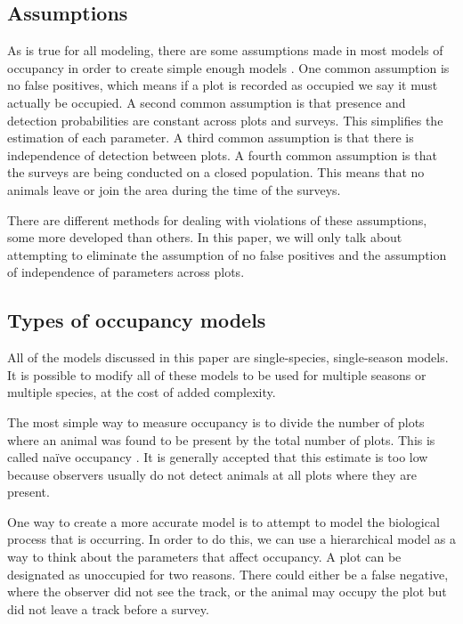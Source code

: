 \documentclass[12pt]{article}
\begin{document}
    \subsection{Assumptions}
    As is true for all modeling, there are some assumptions made in most models
    of occupancy
    in order to create simple enough models \cite{MacKenzie2006}. One common
    assumption is no false positives, which means if a
    plot is recorded as occupied we say it must actually be occupied. A second
    common assumption is that presence and detection probabilities are constant
    across plots and surveys. This simplifies the estimation of each parameter.
    A third common assumption is that there is independence of detection between
    plots. A fourth common assumption is that the surveys are being conducted on
    a closed population. This means that no animals leave or join the
    area during the time of the surveys.

    There are different methods for dealing with violations of these
    assumptions, some more developed than others.  In this paper, we will only
    talk about attempting to eliminate the
    assumption of no false positives and the assumption of independence of
    parameters across plots.

    \subsection{Types of occupancy models}
    All of the models discussed in this paper are single-species, single-season
    models. It is possible to modify all of these models to be used for multiple
    seasons or multiple species, at the cost of added complexity.

    The most simple way to measure occupancy is to divide the number of
    plots where an animal was found to be present by the total number of plots.
    This is called na\"ive occupancy \cite{MacKenzie2006}. It is generally
    accepted that this estimate is too low because observers usually do not
    detect animals at
    all plots where they are present.

    One way to create a more accurate model is to attempt to model the
    biological process that is occurring.  In order to do this, we can use a
    hierarchical model as a
    way to think about the parameters that affect occupancy. A plot can be
    designated as unoccupied for two reasons.
    There could either be
    a false negative, where the observer did not see the track,
    or
    the animal may occupy the plot but did not leave a track before a survey.
\end{document}
